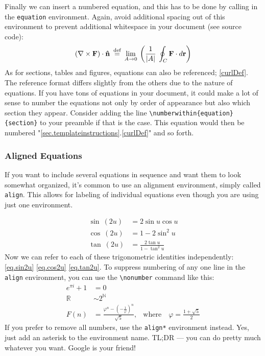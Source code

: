 Finally we can insert a numbered equation, and this has to be done by calling in the \verb|equation| environment. Again, avoid additional spacing out of this environment to prevent additional whitespace in your document (see source code):
\begin{equation}
		\left(\nabla \times \textrm{\textbf{F}} \right) \cdot \textrm{\textbf{\^{n}}} \: \overset{\textrm{def}}{=} \: \lim_{A \to 0} \: \left( \frac{1}{\lvert A \rvert} \: \oint_{C} \textrm{\textbf{F}} \cdot d\textrm{\textbf{r}} \right)
		\label{curlDef}
\end{equation}
As for sections, tables and figures, equations can also be referenced; \eqref{curlDef}. The reference format differs slightly from the others due to the nature of equations. If you have tons of equations in your document, it could make a lot of sense to number the equations not only by order of appearance but also which section they appear. Consider adding the line \verb|\numberwithin{equation}{section}| to your preamble if that is the case. This equation would then be numbered "\ref{sec.templateinstructions}.\ref{curlDef}" and so forth.

\subsubsection{Aligned Equations}\label{sec.alignedequations}

If you want to include several equations in sequence and want them to look somewhat organized, it's common to use an alignment environment, simply called \verb|align|. This allows for labeling of individual equations even though you are using just one environment. %

\begin{align}
\label{eq.sin2u} \sin \: (2u)	& = 2 \sin u \cos u				\\
\label{eq.cos2u} \cos \: (2u) 	& = 1 - 2 \sin^{2} u			\\ 
\label{eq.tan2u} \tan \: (2u)	& = \frac{2\tan u}{1-\tan^{2}u}	
\end{align}
Now we can refer to each of these trigonometric identities independently: \eqref{eq.sin2u} \eqref{eq.cos2u} \eqref{eq.tan2u}. To suppress numbering of any one line in the \verb|align| environment, you can use the \verb|\nonumber| command like this:
\begin{align}
			e^{\pi i} +1 	& =  	0				&	\\
\nonumber 	\mathbb{R}		& \sim  2^{\mathbb{N}}	&	\\
			F(n) 			& =		\frac{\varphi^{n} - \left( - \frac{1}{\varphi} \right)^{n} }{\sqrt{5}}	,& \textrm{where} \quad \varphi = \frac{1 + \sqrt{5}}{2}
\end{align}
If you prefer to remove all numbers, use the \verb|align*| environment instead. Yes, just add an asterisk to the environment name. TL;DR --- you can do pretty much whatever you want. Google is your friend!


